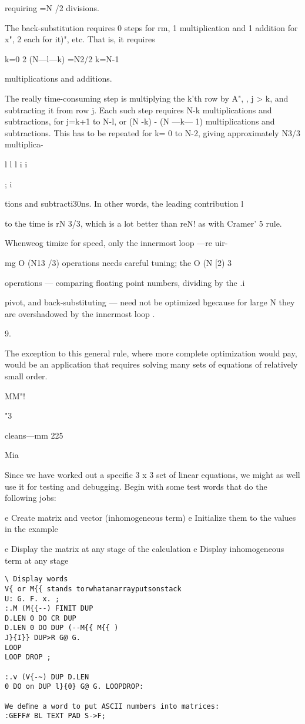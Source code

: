 {requiring =N /2 divisions.

The back-substitution requires 0 steps for rm, 1 multiplication
and 1 addition for x", 2 each for it)", etc. That is, it requires

k=0
2 (N—l—k) =N2/2
k=N-1

multiplications and additions.

The really time-consuming step is multiplying the k'th row by
A", , j > k, and subtracting it from row j. Each such step requires
N-k multiplications and subtractions, for j=k+1 to N-l, or
(N -k) - (N —k— 1) multiplications and subtractions. This has to be
repeated for k= 0 to N-2, giving approximately N3/3 multiplica-

 

l
l
l
i
i}
;
i

 

tions and subtracti30ns. In other words, the leading contribution l

to the time is rN 3/3, which is a lot better than reN! as with
Cramer' 5 rule.

Whenweog timize for speed, only the innermost loop —re uir-

mg O (N13 /3) operations needs careful tuning; the O (N [2) 3

operations — comparing floating point numbers, dividing by the .i

pivot, and back-substituting — need not be optimized bgecause for
large N they are overshadowed by the innermost loop .

 

9.

The exception to this general rule, where more complete optimization would pay, would be an
application that requires solving many sets of equations of relatively small order.

 

MM"!

"3

cleans—mm 225

Mia

Since we have worked out a speciﬁc 3 x 3 set of linear equations,
we might as well use it for testing and debugging. Begin with
some test words that do the following jobs:

e Create matrix and vector (inhomogeneous term)
e Initialize them to the values in the example

e Display the matrix at any stage of the calculation
e Display inhomogeneous term at any stage
\begin{verbatim}
\ Display words
V{ or M{{ stands torwhatanarrayputsonstack
U: G. F. x. ;
:.M (M{{--) FINIT DUP
D.LEN 0 DO CR DUP
D.LEN 0 DO DUP (--M{{ M{{ )
J}{I}} DUP>R G@ G.
LOOP
LOOP DROP ;

:.v (V{-~) DUP D.LEN
0 DO on DUP l}{0} G@ G. LOOPDROP:

We deﬁne a word to put ASCII numbers into matrices:
:GEFF# BL TEXT PAD S->F;
\end{verbatim}

